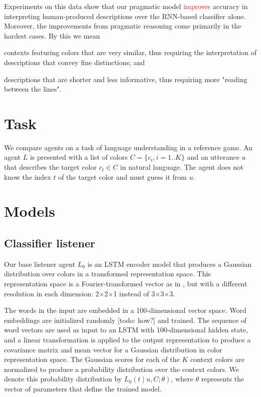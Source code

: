 \documentclass[11pt,letterpaper]{article}
\newcommand{\Listener}{L}
\newcommand{\utt}{u}
\newcommand{\referent}{c}
\newcommand{\context}{C}
\newcommand{\contextlen}{K}
\newcommand{\target}{t}
\renewcommand{\|}{\mid}
\newcommand{\todocheck}[1]{\textcolor{red}{#1}}
\begin{document}
Experiments on this data show that our pragmatic model \todocheck{improves} accuracy
in interpreting human-produced descriptions over the RNN-based classifier
alone. Moreover, the improvements from pragmatic reasoning come primarily
in the hardest cases. By this we mean \begin{enumerate*}[label=(\arabic*)]
\item contexts featuring colors that are very similar, thus
requiring the interpretation of descriptions that convey fine distinctions; and
\item descriptions that are shorter and less informative, thus
requiring more "reading between the lines".
\end{enumerate*}

\section{Task}

We compare agents on a task of language understanding in a reference game. An agent $\Listener$ is presented with a list of colors $\context = \{\referent_i, i=1..\contextlen\}$ and an utterance $\utt$ that describes the target color $\referent_\target \in \context$ in natural language. The agent does not know the index $\target$ of the target color and must guess it from $\utt$.

\section{Models}

\subsection{Classifier listener}

Our base listener agent $L_0$ is an LSTM encoder model that produces a Gaussian
distribution over colors in a transformed representation space. This representation
space is a Fourier-transformed vector as in , but
with a different resolution in each dimension: 2$\times$2$\times$1 instead of
3$\times$3$\times$3.

The words in the input are embedded in a 100-dimensional vector space. Word embeddings
are initialized randomly [todo: how?] and trained. The sequence of word vectors are
used as input to an LSTM with 100-dimensional hidden state, and a linear
transformation is applied to the output representation to produce a covariance matrix
and mean vector for a Gaussian distribution in color representation space. 
The Gaussian scores for each of the $\contextlen$ context colors are normalized to
produce a probability distribution over the context colors. We denote this probability
distribution by $\Listener_0(\target \| \utt, \context; \theta)$, where $\theta$ represents the
vector of parameters that define the trained model.
\end{document}

